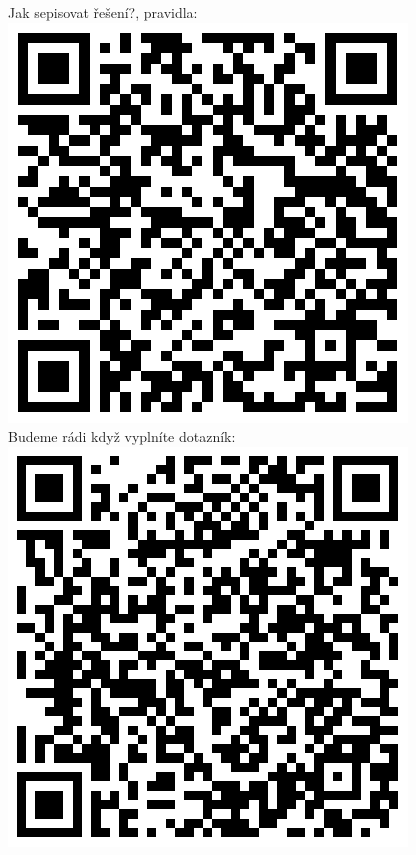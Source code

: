 \documentclass[12pt]{article}
\begin{document}
Jak sepisovat řešení?, pravidla:\\
\includegraphics{../../../propagace/qrcodes/instructions.png}
\\

Budeme rádi když vyplníte dotazník:\\
\includegraphics{../../../propagace/qrcodes/dotaznik.png}
\\
\vspace*{\fill}
\end{document}
